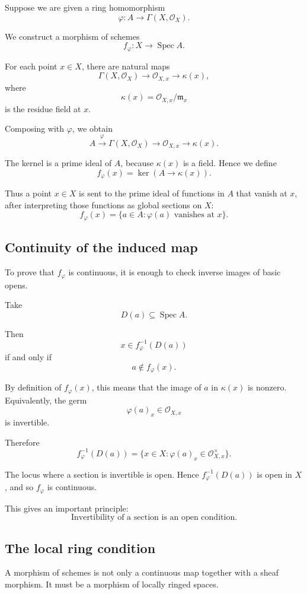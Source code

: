 \documentclass[12pt,a4paper]{article}
\newcommand{\OO}{\mathcal{O}}
\newcommand{\Spec}{\operatorname{Spec}}
\theoremstyle{notespace}
\begin{document}
Suppose we are given a ring homomorphism
\[
\varphi:A\to\Gamma(X,\OO_X).
\]

We construct a morphism of schemes
\[
f_\varphi:X\to\Spec A.
\]

For each point \(x\in X\), there are natural maps
\[
\Gamma(X,\OO_X)
\longrightarrow
\OO_{X,x}
\longrightarrow
\kappa(x),
\]
where
\[
\kappa(x)=\OO_{X,x}/\mathfrak m_x
\]
is the residue field at \(x\).

Composing with \(\varphi\), we obtain
\[
A
\xrightarrow{\varphi}
\Gamma(X,\OO_X)
\longrightarrow
\OO_{X,x}
\longrightarrow
\kappa(x).
\]

The kernel is a prime ideal of \(A\), because \(\kappa(x)\) is a field. Hence we define
\[
f_\varphi(x)=\ker(A\to\kappa(x)).
\]

Thus a point \(x\in X\) is sent to the prime ideal of functions in \(A\) that vanish at \(x\), after interpreting those functions as global sections on \(X\):
\[
\boxed{
	f_\varphi(x)
	=
	\{a\in A:\varphi(a)\text{ vanishes at }x\}.
}
\]

\subsection{Continuity of the induced map}

To prove that \(f_\varphi\) is continuous, it is enough to check inverse images of basic opens.

Take
\[
D(a)\subseteq\Spec A.
\]

Then
\[
x\in f_\varphi^{-1}(D(a))
\]
if and only if
\[
a\notin f_\varphi(x).
\]

By definition of \(f_\varphi(x)\), this means that the image of \(a\) in \(\kappa(x)\) is nonzero. Equivalently, the germ
\[
\varphi(a)_x\in\OO_{X,x}
\]
is invertible.

Therefore
\[
f_\varphi^{-1}(D(a))
=
\{x\in X:\varphi(a)_x\in\OO_{X,x}^{\times}\}.
\]

The locus where a section is invertible is open. Hence \(f_\varphi^{-1}(D(a))\) is open in \(X\), and so \(f_\varphi\) is continuous.

This gives an important principle:
\[
\boxed{
	\text{Invertibility of a section is an open condition.}
}
\]

\subsection{The local ring condition}

A morphism of schemes is not only a continuous map together with a sheaf morphism. It must be a morphism of locally ringed spaces.
\end{document}
